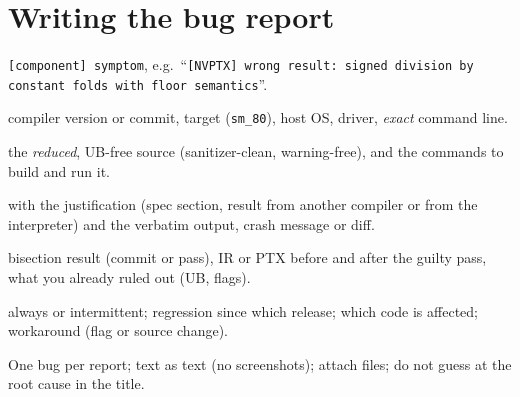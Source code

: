 \documentclass[10pt,a4paper,openany,oneside]{report}
\newcommand{\prio}[1]{\texorpdfstring{\ifcase#1\or{\color{gold}\ding{72}}\or{\color{gold}\ding{72}\ding{72}}\or{\color{gold}\ding{72}\ding{72}\ding{72}}\fi}{}}
\begin{document}
\section{Writing the bug report \prio{2}}
\label{sec:report}
\begin{defbox}
\begin{description}[nosep,leftmargin=2.7cm,style=nextline]
\item[Title] \texttt{[component] symptom}, e.g.\ ``\texttt{[NVPTX] wrong result: signed division by constant folds with floor semantics}''.
\item[Environment] compiler version or commit, target (\texttt{sm\_80}), host OS, driver, \emph{exact} command line.
\item[Reproducer] the \emph{reduced}, UB-free source (sanitizer-clean, warning-free), and the commands to build and run it.
\item[Expected / actual] with the justification (spec section, result from another compiler or from the interpreter) and the verbatim output, crash message or diff.
\item[Analysis] bisection result (commit or pass), IR or PTX before and after the guilty pass, what you already ruled out (UB, flags).
\item[Impact] always or intermittent; regression since which release; which code is affected; workaround (flag or source change).
\end{description}
One bug per report; text as text (no screenshots); attach files; do not guess at the root cause in the title.
\end{defbox}
\end{document}
